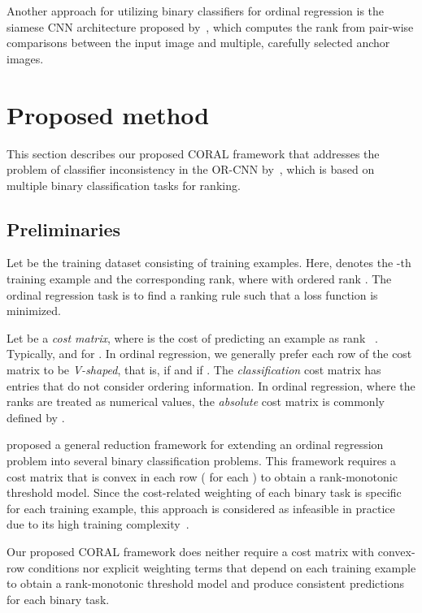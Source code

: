 \documentclass[times,twocolumn,final,authoryear]{elsarticle}
\begin{document}
Another approach for utilizing binary classifiers for ordinal regression is the siamese CNN architecture proposed by~\cite{polania2018ordinal}, which computes the rank from pair-wise comparisons between the input image and multiple, carefully selected anchor images.



\section{Proposed method}
\label{sec:proposed}

This section describes our proposed CORAL framework that addresses the problem of classifier inconsistency in the OR-CNN by~\cite{niu2016ordinal}, which is based on multiple binary classification tasks for ranking.

\subsection{Preliminaries}

Let  be the training dataset consisting of  training examples. Here,  denotes the -th training example and  the corresponding rank, where  with ordered rank .  The ordinal regression task is to find a ranking rule  such that a loss function  is minimized. 

Let  be a  \emph{cost matrix}, where  is the cost of predicting an example  as rank ~\citep{li2007ordinal}. Typically,  and  for . In ordinal regression, we generally prefer each row of the cost matrix to be \emph{V-shaped}, that is,  if   and  if . The \emph{classification} cost matrix has entries  that do not consider ordering information. In ordinal regression, where the ranks are treated as numerical values, the \emph{absolute} cost matrix is commonly defined by .

\cite{li2007ordinal} proposed a general reduction framework for extending an ordinal regression problem into several binary classification problems. This framework requires a cost matrix that is convex in each row ( for each ) to obtain a rank-monotonic threshold model. Since the cost-related weighting of each binary task is specific for each training example, this approach is considered as infeasible in practice due to its high training complexity~\citep{niu2016ordinal}. 

Our proposed CORAL framework does neither require a cost matrix with convex-row conditions nor explicit weighting terms that depend on each training example to obtain a rank-monotonic threshold model and produce consistent predictions for each binary task. 
\end{document}
